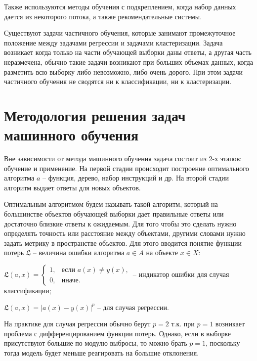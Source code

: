 Также используются методы обучения с подкреплением, когда набор данных дается из некоторого потока, а также рекомендательные системы.

Существуют задачи частичного обучения, которые занимают промежуточное положение между задачами регрессии и задачами кластеризации. Задача возникает когда только на части обучающей выборки даны ответы, а другая часть неразмечена, обычно такие задачи возникают при больших объемах данных, когда разметить всю выборку либо невозможно, либо очень дорого. При этом задачи частичного обучения не сводятся ни к классификации, ни к кластеризации.



\section{Методология решения задач машинного обучения}

Вне зависимости от метода машинного обучения задача состоит из 2-х этапов: обучение и применение.
На первой стадии происходит построение оптимального алгоритма $a$ -- функция, дерево, набор инструкций и др. На второй стадии алгоритм выдает ответы для новых объектов.

Оптимальным алгоритмом будем называть такой алгоритм, который на большинстве объектов обучающей выборки дает правильные ответы или достаточно близкие ответы к ожидаемым. Для того чтобы это сделать нужно определять точность или расстояние между объектами, другими словами нужно задать метрику в пространстве объектов. Для этого вводится понятие функции потерь $\mathfrak{L}$ -- величина ошибки алгоритма $a \in A$ на объекте $x \in X$:
\begin{description}[font=$\bullet$]
    \item $\mathfrak{L} (a,x)=
    \begin{cases}
        1, &\text{если $a(x) \neq y(x)$,}\\
        0, &\text{иначе.}
    \end{cases}
    $ -- индикатор ошибки для случая классификации;
    \item $\mathfrak{L} (a,x)= |a(x) - y(x)|^p$ -- для случая регрессии.
\end{description}


На практике для случая регрессии обычно берут $p=2$ т.к. при $p=1$ возникает проблема с дифференцированием функции потерь. Однако, если в выборке присутствуют большие по модулю выбросы, то можно брать $p=1$, поскольку тогда модель будет меньше реагировать на большие отклонения.

